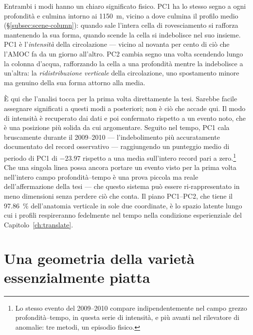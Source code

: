 Entrambi i modi hanno un chiaro significato fisico. PC1 ha lo stesso segno a ogni profondità e culmina intorno ai 1150~m, vicino a dove culmina il profilo medio (\S\ref{subsec:scene-column}): quando sale l'intera cella di rovesciamento si rafforza mantenendo la sua forma, quando scende la cella si indebolisce nel suo insieme. PC1 è l'\emph{intensità} della circolazione --- vicino al novanta per cento di ciò che l'AMOC fa da un giorno all'altro. PC2 cambia segno una volta scendendo lungo la colonna d'acqua, rafforzando la cella a una profondità mentre la indebolisce a un'altra: la \emph{ridistribuzione verticale} della circolazione, uno spostamento minore ma genuino della sua forma attorno alla media.



È qui che l'analisi tocca per la prima volta direttamente la tesi. Sarebbe facile assegnare significati a questi modi a posteriori; non è ciò che accade qui. Il modo di intensità è recuperato dai dati e poi confermato rispetto a un evento noto, che è una posizione più solida da cui argomentare. Seguito nel tempo, PC1 cala bruscamente durante il 2009--2010 --- l'indebolimento più accuratamente documentato del record osservativo --- raggiungendo un punteggio medio di periodo di PC1 di $-23.97$ rispetto a una media sull'intero record pari a zero.\footnote{Lo stesso evento del 2009--2010 compare indipendentemente nel campo grezzo profondità--tempo, in questa serie di intensità, e più avanti nel rilevatore di anomalie: tre metodi, un episodio fisico.} Che una singola linea possa ancora portare un evento visto per la prima volta nell'intero campo profondità--tempo è una prova piccola ma reale dell'affermazione della tesi --- che questo sistema può essere ri-rappresentato in meno dimensioni senza perdere ciò che conta. Il piano PC1--PC2, che tiene il \SI{97.86}{\percent} dell'anatomia verticale in sole due coordinate, è lo spazio latente lungo cui i profili respireranno fedelmente nel tempo nella condizione esperienziale del Capitolo~\ref{ch:translate}.

\section{Una geometria della varietà essenzialmente piatta}
\label{sec:detect-ae}

